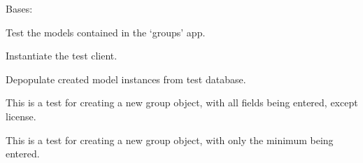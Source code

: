 \documentclass[letterpaper,10pt,english]{sphinxmanual}
\begin{document}
\begin{fulllineitems}
\label{api:mousedb.groups.tests.GroupsModelTests}
Bases: 

Test the models contained in the `groups' app.


\begin{fulllineitems}
\label{api:mousedb.groups.tests.GroupsModelTests.setUp}
Instantiate the test client.

\end{fulllineitems}



\begin{fulllineitems}
\label{api:mousedb.groups.tests.GroupsModelTests.tearDown}
Depopulate created model instances from test database.

\end{fulllineitems}



\begin{fulllineitems}
\label{api:mousedb.groups.tests.GroupsModelTests.test_create_group_all_fields}
This is a test for creating a new group object, with all fields being entered, except license.

\end{fulllineitems}



\begin{fulllineitems}
\label{api:mousedb.groups.tests.GroupsModelTests.test_create_group_minimal}
This is a test for creating a new group object, with only the minimum being entered.

\end{fulllineitems}




\end{fulllineitems}
\end{document}
